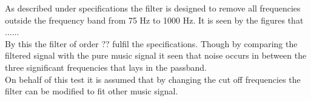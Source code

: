As described under specifications the filter is designed to remove all frequencies outside the frequency band from 75 Hz to 1000 Hz. It is seen by the figures that ...... \\
By this the filter of order ?? fulfil the specifications. Though by comparing the filtered signal with the pure music signal it seen that noise occurs in between the three significant frequencies that lays in the passband.  \\
On behalf of this test it is assumed that by changing the cut off frequencies the filter can be modified to fit other music signal.    
